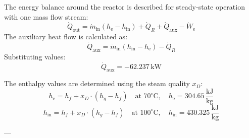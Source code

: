 The energy balance around the reactor is described for steady-state operation with one mass flow stream:  
\[
\dot{Q}_{\text{out}} = \dot{m}_{\text{in}} \left( h_{\text{e}} - h_{\text{in}} \right) + \dot{Q}_R + \dot{Q}_{\text{aux}} - \dot{W}_{\text{e}}
\]  
The auxiliary heat flow is calculated as:  
\[
\dot{Q}_{\text{aux}} = \dot{m}_{\text{in}} \left( h_{\text{in}} - h_{\text{e}} \right) - \dot{Q}_R  
\]  
Substituting values:  
\[
\dot{Q}_{\text{aux}} = -62.237 \, \text{kW}
\]  

The enthalpy values are determined using the steam quality \( x_D \):  
\[
h_{\text{e}} = h_f + x_D \cdot (h_g - h_f) \quad \text{at } 70^\circ\text{C}, \quad h_{\text{e}} = 304.65 \, \frac{\text{kJ}}{\text{kg}}
\]  
\[
h_{\text{in}} = h_f + x_D \cdot (h_g - h_f) \quad \text{at } 100^\circ\text{C}, \quad h_{\text{in}} = 430.325 \, \frac{\text{kJ}}{\text{kg}}
\]  

---